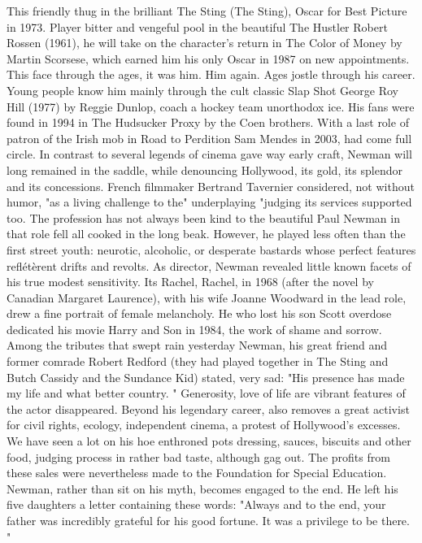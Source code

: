 This friendly thug in the brilliant The Sting (The Sting), Oscar for Best Picture in 1973.
Player bitter and vengeful pool in the beautiful The Hustler Robert Rossen (1961), he will take on the character's return in The Color of Money by Martin Scorsese, which earned him his only Oscar in 1987 on new appointments.
This face through the ages, it was him.
Him again.
Ages jostle through his career.
Young people know him mainly through the cult classic Slap Shot George Roy Hill (1977) by Reggie Dunlop, coach a hockey team unorthodox ice.
His fans were found in 1994 in The Hudsucker Proxy by the Coen brothers.
With a last role of patron of the Irish mob in Road to Perdition Sam Mendes in 2003, had come full circle.
In contrast to several legends of cinema gave way early craft, Newman will long remained in the saddle, while denouncing Hollywood, its gold, its splendor and its concessions.
French filmmaker Bertrand Tavernier considered, not without humor, "as a living challenge to the" underplaying "judging its services supported too.
The profession has not always been kind to the beautiful Paul Newman in that role fell all cooked in the long beak.
However, he played less often than the first street youth: neurotic, alcoholic, or desperate bastards whose perfect features reflétèrent drifts and revolts.
As director, Newman revealed little known facets of his true modest sensitivity.
Its Rachel, Rachel, in 1968 (after the novel by Canadian Margaret Laurence), with his wife Joanne Woodward in the lead role, drew a fine portrait of female melancholy.
He who lost his son Scott overdose dedicated his movie Harry and Son in 1984, the work of shame and sorrow.
Among the tributes that swept rain yesterday Newman, his great friend and former comrade Robert Redford (they had played together in The Sting and Butch Cassidy and the Sundance Kid) stated, very sad: "His presence has made my life and what better country. "
Generosity, love of life are vibrant features of the actor disappeared.
Beyond his legendary career, also removes a great activist for civil rights, ecology, independent cinema, a protest of Hollywood's excesses.
We have seen a lot on his hoe enthroned pots dressing, sauces, biscuits and other food, judging process in rather bad taste, although gag out.
The profits from these sales were nevertheless made to the Foundation for Special Education.
Newman, rather than sit on his myth, becomes engaged to the end.
He left his five daughters a letter containing these words: "Always and to the end, your father was incredibly grateful for his good fortune.
It was a privilege to be there. "
